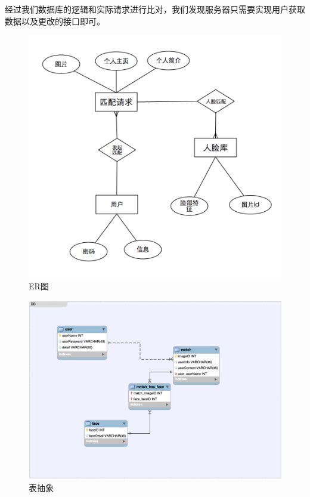 经过我们数据库的逻辑和实际请求进行比对，我们发现服务器只需要实现用户获取数据以及更改的接口即可。
\begin{figure}[h]
\centering
\includegraphics[width=\textwidth]{img/chap3/ER.png}
\caption{ER图\label{Face++API}}
\end{figure}


\begin{figure}[h]
\centering
\includegraphics[width=\textwidth]{img/chap3/database.png}
\caption{表抽象\label{Face++API}}
\end{figure}






